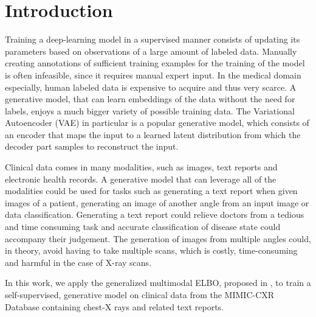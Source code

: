 \section{Introduction}

	Training a deep-learning model in a supervised manner consists of updating its parameters based on observations of a large amount of labeled data.
	Manually creating annotations of sufficient training examples for the training of the model is often infeasible, since it requires manual expert input.
	In the medical domain especially, human labeled data is expensive to acquire and thus very scarce.
	A generative model, that can learn embeddings of the data without the need for labels, enjoys a much bigger variety of possible training data.
	The Variational Autoencoder (VAE) \cite{doersch2016tutorial} in particular is a popular generative model, which consists of an encoder that maps the input to a learned latent distribution from which the decoder part samples to reconstruct the input.

	Clinical data comes in many modalities, such as images, text reports and electronic health records.
	A generative model that can leverage all of the modalities could be used for tasks such as generating a text report when given images of a patient, generating an image of another angle from an input image or data classification.
	Generating a text report could relieve doctors from a tedious and time consuming task and accurate classification of disease state could accompany their judgement.
	The generation of images from multiple angles could, in theory, avoid having to take multiple scans, which is costly, time-consuming and harmful in the case of X-ray scans.

	In this work, we apply the generalized multimodal ELBO, proposed in \cite{thomas_gener-ELBO}, to train a self-supervised, generative model on clinical data from the MIMIC-CXR Database \cite{johnson2019mimic} containing chest-X rays and related text reports.

